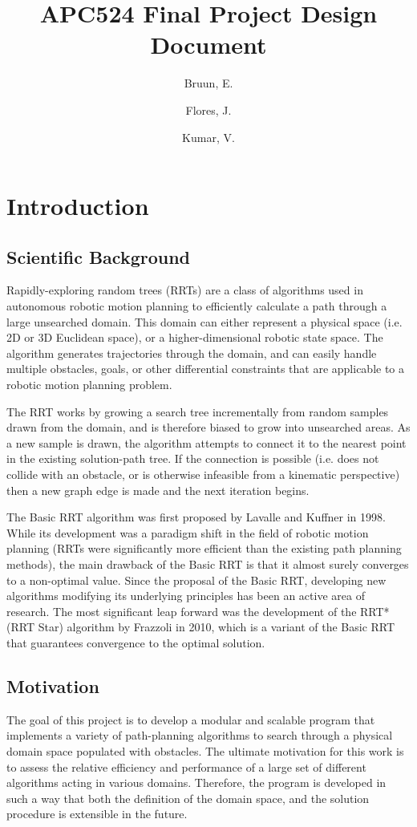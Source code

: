 \documentclass[10pt]{article}
\title{APC524 Final Project Design Document}
\author{Bruun, E. \and Flores, J. \and Kumar, V.}
\begin{document}
\maketitle

\section{Introduction}

	\subsection{Scientific Background}
		Rapidly-exploring random trees (RRTs) are a class of algorithms used in autonomous robotic motion planning to efficiently calculate a path through a large unsearched domain. This domain can either represent a physical space (i.e. 2D or 3D Euclidean space), or a higher-dimensional robotic state space. The algorithm generates trajectories through the domain, and can easily handle multiple obstacles, goals, or other differential constraints that are applicable to a robotic motion planning problem.
		
		The RRT works by growing a search tree incrementally from random samples drawn from the domain, and is therefore biased to grow into unsearched areas. As a new sample is drawn, the algorithm attempts to connect it to the nearest point in the existing solution-path tree. If the connection is possible (i.e. does not collide with an obstacle, or is otherwise infeasible from a kinematic perspective) then a new graph edge is made and the next iteration begins.
		
		The Basic RRT algorithm was first proposed by Lavalle and Kuffner in 1998. While its development was a paradigm shift in the field of robotic motion planning (RRTs were significantly more efficient than the existing path planning methods), the main drawback of the Basic RRT is that it almost surely converges to a non-optimal value. Since the proposal of the Basic RRT, developing new algorithms modifying its underlying principles has been an active area of research. The most significant leap forward was the development of the RRT* (RRT Star) algorithm by Frazzoli in 2010, which is a variant of the Basic RRT that guarantees convergence to the optimal solution.

	\subsection{Motivation}
		The goal of this project is to develop a modular and scalable program that implements a variety of path-planning algorithms to search through a physical domain space populated with obstacles. The ultimate motivation for this work is to assess the relative efficiency and performance of a large set of different algorithms acting in various domains. Therefore, the program is developed in such a way that both the definition of the domain space, and the solution procedure is extensible in the future. 
\end{document}

